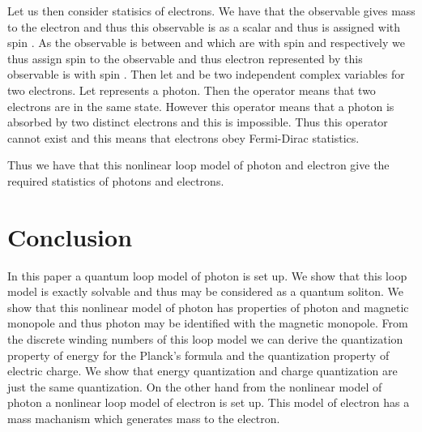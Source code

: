 \documentclass[a4paper,a4paper]{article}
\begin{document}
Let us then consider statisics of electrons. We have that the observable \coordHE{} gives mass to the electron \coordHE{} and thus this observable is as a scalar and thus is assigned with spin \coordHE{}. As the observable \coordHE{} is between \coordHE{} and \coordHE{} which are with spin \coordHE{} and \coordHE{} respectively we thus assign spin \coordHE{} to the observable \coordHE{} and thus electron represented by this observable \coordHE{} is with  spin \coordHE{}.
Then let \coordHE{} and \coordHE{} be two independent complex variables for two electrons. Let  \coordHE{} represents a photon. Then the operator \coordHE{} means that two electrons are in the same state. However this operator means that a photon \coordHE{} is absorbed by two distinct electrons and this is impossible. Thus this operator \coordHE{} cannot exist and this means that electrons obey Fermi-Dirac statistics.

Thus we have that this nonlinear loop model of photon and electron give the required statistics of photons and electrons.


\section{Conclusion}

In this paper a quantum loop model of photon is set up. We show that this loop model is exactly solvable and thus may be considered as a quantum soliton. We show that this nonlinear model of photon has properties of photon and magnetic monopole and thus photon may be identified with the magnetic monopole. From the discrete winding numbers of this loop model we can derive the quantization property of energy for the Planck's formula and the quantization property of electric charge. We show that energy quantization and charge quantization are just the same quantization. On the other hand from the nonlinear model of photon a nonlinear loop model of electron is set up. This model of electron has a mass machanism which generates mass to the electron. 
\end{document}
